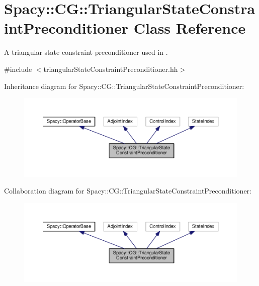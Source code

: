 \hypertarget{classSpacy_1_1CG_1_1TriangularStateConstraintPreconditioner}{}\section{Spacy\+:\+:CG\+:\+:Triangular\+State\+Constraint\+Preconditioner Class Reference}
\label{classSpacy_1_1CG_1_1TriangularStateConstraintPreconditioner}


A triangular state constraint preconditioner used in \cite{Lubkoll2015a}.  




{\ttfamily \#include $<$triangular\+State\+Constraint\+Preconditioner.\+hh$>$}



Inheritance diagram for Spacy\+:\+:CG\+:\+:Triangular\+State\+Constraint\+Preconditioner\+:
\nopagebreak
\begin{figure}[H]
\begin{center}
\leavevmode
\includegraphics[width=350pt]{classSpacy_1_1CG_1_1TriangularStateConstraintPreconditioner__inherit__graph}
\end{center}
\end{figure}


Collaboration diagram for Spacy\+:\+:CG\+:\+:Triangular\+State\+Constraint\+Preconditioner\+:
\nopagebreak
\begin{figure}[H]
\begin{center}
\leavevmode
\includegraphics[width=350pt]{classSpacy_1_1CG_1_1TriangularStateConstraintPreconditioner__coll__graph}
\end{center}
\end{figure}
